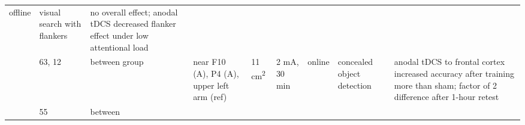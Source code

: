 \documentclass[11pt,english,]{memoir}
\begin{document}
\begin{longtable}[]{@{}lllllllll@{}}
\begin{minipage}[t]{0.05\columnwidth}
offline\strut
\end{minipage} & \begin{minipage}[t]{0.06\columnwidth}\raggedright
visual
search
with
flankers\strut
\end{minipage} & \begin{minipage}[t]{0.25\columnwidth}\raggedright
no overall effect; anodal tDCS decreased flanker
effect under low attentional load\strut
\end{minipage}\tabularnewline
\begin{minipage}[t]{0.08\columnwidth}\raggedright
\textcite{Clark2012}\strut
\end{minipage} & \begin{minipage}[t]{0.03\columnwidth}\raggedright
63,
12\strut
\end{minipage} & \begin{minipage}[t]{0.05\columnwidth}\raggedright
between
group\strut
\end{minipage} & \begin{minipage}[t]{0.15\columnwidth}\raggedright
near F10 (A), P4 (A), upper
left arm (ref)\strut
\end{minipage} & \begin{minipage}[t]{0.04\columnwidth}\raggedright
11
cm\textsuperscript{2}\strut
\end{minipage} & \begin{minipage}[t]{0.06\columnwidth}\raggedright
2 mA, 30
min\strut
\end{minipage} & \begin{minipage}[t]{0.05\columnwidth}\raggedright
online\strut
\end{minipage} & \begin{minipage}[t]{0.06\columnwidth}\raggedright
concealed
object
detection\strut
\end{minipage} & \begin{minipage}[t]{0.25\columnwidth}\raggedright
anodal tDCS to frontal cortex increased accuracy
after training more than sham; factor of 2
difference after 1-hour retest\strut
\end{minipage}\tabularnewline
\begin{minipage}[t]{0.08\columnwidth}\raggedright
\textcite{Coffman2012}\strut
\end{minipage} & \begin{minipage}[t]{0.03\columnwidth}\raggedright
55\strut
\end{minipage} & \begin{minipage}[t]{0.05\columnwidth}\raggedright
between

\end{minipage}
\end{longtable}
\end{document}
